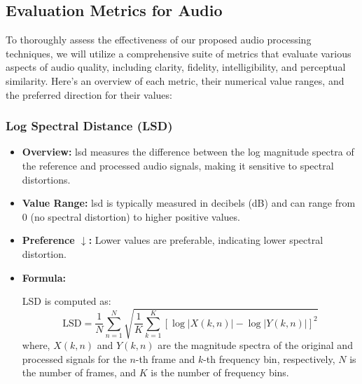 \documentclass{ioereport}
\begin{document}
\subsection{Evaluation Metrics for Audio}
To thoroughly assess the effectiveness of our proposed audio processing techniques, we will utilize a comprehensive suite of metrics that evaluate various aspects of audio quality, including clarity, fidelity, intelligibility, and perceptual similarity. Here's an overview of each metric, their numerical value ranges, and the preferred direction for their values:

\subsubsection{Log Spectral Distance (LSD)}
\begin{itemize}
    \item \textbf{Overview:} \gls{lsd} measures the difference between the log magnitude spectra of the reference and processed audio signals, making it sensitive to spectral distortions.
    
    \item \textbf{Value Range:} \gls{lsd} is typically measured in decibels (dB) and can range from 0 (no spectral distortion) to higher positive values.
    
    \item \textbf{Preference $\downarrow$:} Lower values are preferable, indicating lower spectral distortion.
    
    \item \textbf{Formula:}
    
    LSD is computed as:
    \begin{equation}
        \text{LSD} = \frac{1}{N} \sum_{n=1}^{N} \sqrt{\frac{1}{K} \sum_{k=1}^{K} \left[ \log |X(k,n)| - \log |Y(k,n)| \right]^2}
    \end{equation}
    where, \( X(k,n) \) and \( Y(k,n) \) are the magnitude spectra of the original and processed signals for the \( n \)-th frame and \( k \)-th frequency bin, respectively, \( N \) is the number of frames, and \( K \) is the number of frequency bins.
\end{itemize}
\end{document}
